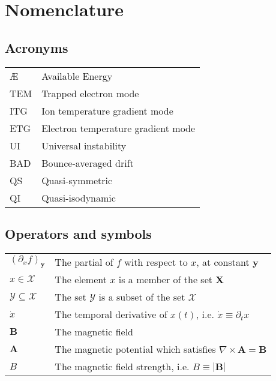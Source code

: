 \newenvironment{Nomen}
    {\vspace*{-3mm}\begin{center}
    \begin{longtable}{p{.1\textwidth} p{.83\textwidth}}
    }
    {
    \end{longtable}
    \end{center}\vspace*{-1.2cm}
    }
\newcommand{\AddSymbol}[2]{#1 & #2 \\}




\chapter*{Nomenclature}


\section*{Acronyms}

\begin{Nomen}
\AddSymbol{\AE{}}{Available Energy}
\AddSymbol{TEM}{Trapped electron mode}
\AddSymbol{ITG}{Ion temperature gradient mode}
\AddSymbol{ETG}{Electron temperature gradient mode}
\AddSymbol{UI}{Universal instability}
\AddSymbol{BAD}{Bounce-averaged drift}
\AddSymbol{QS}{Quasi-symmetric}
\AddSymbol{QI}{Quasi-isodynamic}
\end{Nomen}


\section*{Operators and  symbols}

\begin{Nomen}
\AddSymbol{$(\partial_x f)_{\boldsymbol{y}}$}{The partial of $f$ with respect to $x$, at constant $\boldsymbol{y}$}
\AddSymbol{$x \in \mathcal{X}$}{The element $x$ is a member of the set $\boldsymbol{X}$}
\AddSymbol{$\mathcal{Y} \subseteq \mathcal{X}$}{The set $\mathcal{Y}$ is a subset of the set $\mathcal{X}$}
\AddSymbol{$\dot{x}$}{The temporal derivative of $x(t)$, i.e. $\dot{x} \equiv \partial_t x$}
\AddSymbol{$\boldsymbol{B}$}{The magnetic field}
\AddSymbol{$\boldsymbol{A}$}{The magnetic potential which satisfies $\nabla \times \boldsymbol{A} = \boldsymbol{B}$}
\AddSymbol{$B$}{The magnetic field strength, i.e. $B \equiv |\boldsymbol{B}|$}



\end{Nomen}


